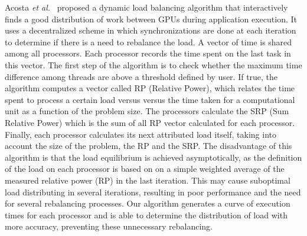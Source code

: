 \documentclass[journal]{IEEEtran}
\begin{document}
Acosta \textit{et al.}~\cite{acosta} proposed a dynamic load balancing algorithm
that interactively finds a good distribution of work between GPUs during
application execution. It uses a decentralized scheme in which synchronizations
are done at each iteration to determine if there is a need to rebalance the
load. A vector of time is shared among all processors. Each processor records
the time spent on the last task in this vector. The first step of the algorithm
is to check whether the maximum time difference among threads are above a
threshold defined by user. If true, the algorithm computes a vector called RP
(Relative Power), which relates the time spent to process a certain load versus
versus the time taken for a computational unit as a function of the problem
size. The processors calculate the SRP (Sum Relative Power) which is the sum of
all RP vector calculated for each processor. Finally, each processor calculates
its next attributed load itself, taking into account the size of the problem,
the RP and the SRP. The disadvantage of this algorithm is that the load
equilibrium is achieved asymptotically, as the definition of the load on each
processor is based on on a simple weighted average of the measured relative
power (RP) in the last iteration. This may cause suboptimal load distributing in
several iterations, resulting in poor performance and the need for several
rebalancing processes. Our algorithm generates a curve of execution times for
each processor and is able to determine the distribution of load with more
accuracy, preventing these unnecessary rebalancing.
\end{document}
